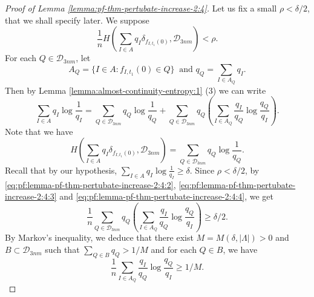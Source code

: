 \documentclass[a4paper,11pt]{amsart}
\theoremstyle{definition}
\numberwithin{equation}{section}
\def\D{\mathcal{D}}
\begin{document}
\begin{proof}[Proof of Lemma \ref{lemma:pf-thm-pertubate-increase-2:4}]
Let us fix a small $\rho<\delta/2$, that we shall specify later.  We suppose 
\begin{equation}\label{eq:pf:lemma-pf-thm-pertubate-increase-2:4:2}
\frac{1}{n}H\left( \sum_{I\in A} q_I\delta_{f_{I,t_1}(0)} ,\D_{3nm}\right) <\rho.
\end{equation}
For each $Q\in \D_{3nm}$, let 
\[
A_Q=\{I\in A:f_{I,t_1}(0)\in Q\} \ \textrm{ and }  q_Q=\sum_{I\in A_Q}q_I.
\]
Then by Lemma \ref{lemma:almost-continuity-entropy:1} (3) we can write 
\begin{equation}\label{eq:pf:lemma-pf-thm-pertubate-increase-2:4:3}
\sum_{I\in A} q_I\log \frac{1}{q_I} =\sum_{Q\in\D_{3nm}} q_Q\log \frac{1}{q_Q} +\sum_{Q\in \D_{3nm}}q_Q\left( \sum_{I\in A_Q}\frac{q_I}{q_Q}\log \frac{q_Q}{q_I} \right). 
\end{equation}
Note that we have
\begin{equation}\label{eq:pf:lemma-pf-thm-pertubate-increase-2:4:4}
H\left( \sum_{I\in A} q_I\delta_{f_{I,t_1}(0)} ,\D_{3nm} \right) = \sum_{Q\in\D_{3nm}} q_Q\log \frac{1}{q_Q} .
\end{equation}
Recall that by our hypothesis,  $\sum_{I\in A} q_I\log \frac{1}{q_I}\ge \delta$.  Since $\rho<\delta/2$,  by \eqref{eq:pf:lemma-pf-thm-pertubate-increase-2:4:2}, \eqref{eq:pf:lemma-pf-thm-pertubate-increase-2:4:3} and \eqref{eq:pf:lemma-pf-thm-pertubate-increase-2:4:4},  we get
\[
\frac{1}{n} \sum_{Q\in \D_{3nm}}q_Q\left( \sum_{I\in A_Q}\frac{q_I}{q_Q}\log \frac{q_Q}{q_I} \right) \ge \delta/2.
\]
By Markov's inequality, we deduce that there exist $M=M(\delta,|\Lambda|)>0$ and $B\subset \D_{3nm}$ such that $\sum_{Q\in B}q_Q>1/M$ and for each $Q\in B$,  we have
\begin{equation}\label{eq:pf:lemma-pf-thm-pertubate-increase-2:4:5}
\frac{1}{n} \sum_{I\in A_Q}\frac{q_I}{q_Q}\log \frac{q_Q}{q_I} \ge 1/M.
\end{equation}


\end{proof}
\end{document}
